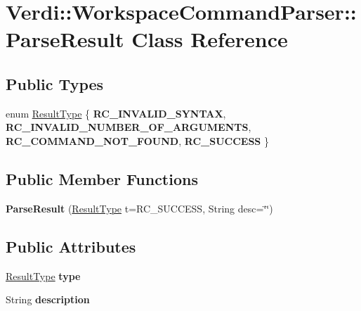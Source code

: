 \hypertarget{class_verdi_1_1_workspace_command_parser_1_1_parse_result}{\section{\-Verdi\-:\-:\-Workspace\-Command\-Parser\-:\-:\-Parse\-Result \-Class \-Reference}
\label{class_verdi_1_1_workspace_command_parser_1_1_parse_result}
}
\subsection*{\-Public \-Types}
\begin{DoxyCompactItemize}
\item 
enum \hyperlink{class_verdi_1_1_workspace_command_parser_1_1_parse_result_a66a689e736943fdd8d7390535d4b2554}{\-Result\-Type} \{ {\bfseries \-R\-C\-\_\-\-I\-N\-V\-A\-L\-I\-D\-\_\-\-S\-Y\-N\-T\-A\-X}, 
{\bfseries \-R\-C\-\_\-\-I\-N\-V\-A\-L\-I\-D\-\_\-\-N\-U\-M\-B\-E\-R\-\_\-\-O\-F\-\_\-\-A\-R\-G\-U\-M\-E\-N\-T\-S}, 
{\bfseries \-R\-C\-\_\-\-C\-O\-M\-M\-A\-N\-D\-\_\-\-N\-O\-T\-\_\-\-F\-O\-U\-N\-D}, 
{\bfseries \-R\-C\-\_\-\-S\-U\-C\-C\-E\-S\-S}
 \}
\end{DoxyCompactItemize}
\subsection*{\-Public \-Member \-Functions}
\begin{DoxyCompactItemize}
\item 
\hypertarget{class_verdi_1_1_workspace_command_parser_1_1_parse_result_a48cf54e0fb11adf46b727804806f98a7}{{\bfseries \-Parse\-Result} (\hyperlink{class_verdi_1_1_workspace_command_parser_1_1_parse_result_a66a689e736943fdd8d7390535d4b2554}{\-Result\-Type} t=\-R\-C\-\_\-\-S\-U\-C\-C\-E\-S\-S, \-String desc=\char`\"{}\char`\"{})}\label{class_verdi_1_1_workspace_command_parser_1_1_parse_result_a48cf54e0fb11adf46b727804806f98a7}

\end{DoxyCompactItemize}
\subsection*{\-Public \-Attributes}
\begin{DoxyCompactItemize}
\item 
\hypertarget{class_verdi_1_1_workspace_command_parser_1_1_parse_result_aac8f074a4f772080432fc34df5aee09f}{\hyperlink{class_verdi_1_1_workspace_command_parser_1_1_parse_result_a66a689e736943fdd8d7390535d4b2554}{\-Result\-Type} {\bfseries type}}\label{class_verdi_1_1_workspace_command_parser_1_1_parse_result_aac8f074a4f772080432fc34df5aee09f}

\item 
\hypertarget{class_verdi_1_1_workspace_command_parser_1_1_parse_result_a927e3a956ae4c818a6a9e7acb64fd310}{\-String {\bfseries description}}\label{class_verdi_1_1_workspace_command_parser_1_1_parse_result_a927e3a956ae4c818a6a9e7acb64fd310}

\end{DoxyCompactItemize}


